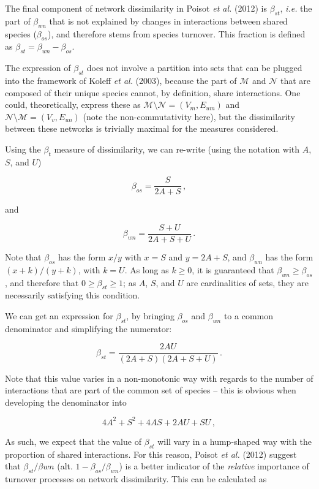 \documentclass[11pt]{article}
\begin{document}
The final component of network dissimilarity in Poisot \emph{et al.}
(2012) is \(\beta_{st}\), \emph{i.e.} the part of \(\beta_{wn}\) that is
not explained by changes in interactions between shared species
(\(\beta_{os}\)), and therefore stems from species turnover. This
fraction is defined as \(\beta_{st} = \beta_{wn}-\beta_{os}\).

The expression of \(\beta_{st}\) does not involve a partition into sets
that can be plugged into the framework of Koleff \emph{et al.} (2003),
because the part of \(\mathcal{M}\) and \(\mathcal{N}\) that are
composed of their unique species cannot, by definition, share
interactions. One could, theoretically, express these as
\(\mathcal{M} \setminus \mathcal{N} = (V_m, E_{um})\) and
\(\mathcal{N} \setminus \mathcal{M} = (V_v, E_{un})\) (note the
non-commutativity here), but the dissimilarity between these networks is
trivially maximal for the measures considered.

Using the \(\beta_t\) measure of dissimilarity, we can re-write (using
the notation with \(A\), \(S\), and \(U\))

\[\beta_{os} = \frac{S}{2A+S}\,,\]

and

\[\beta_{wn} = \frac{S+U}{2A+S+U}\,.\]

Note that \(\beta_{os}\) has the form \(x/y\) with \(x = S\) and
\(y = 2A+S\), and \(\beta_{wn}\) has the form \((x+k)/(y+k)\), with
\(k = U\). As long as \(k \ge 0\), it is guaranteed that
\(\beta_{wn} \ge \beta_{os}\), and therefore that
\(0 \ge \beta_{st} \ge 1\); as \(A\), \(S\), and \(U\) are cardinalities
of sets, they are necessarily satisfying this condition.

We can get an expression for \(\beta_{st}\), by bringing \(\beta_{os}\)
and \(\beta_{wn}\) to a common denominator and simplifying the
numerator:

\[\beta_{st} = \frac{2AU}{(2A+S)(2A+S+U)}\,.\]

Note that this value varies in a non-monotonic way with regards to the
number of interactions that are part of the common set of species --
this is obvious when developing the denominator into

\[4A^2 + S^2 + 4AS + 2AU + SU\,,\]

As such, we expect that the value of \(\beta_{st}\) will vary in a
hump-shaped way with the proportion of shared interactions. For this
reason, Poisot \emph{et al.} (2012) suggest that
\(\beta_{st}/\beta{wn}\) (alt. \(1-\beta_{os}/\beta_{wn}\)) is a better
indicator of the \emph{relative} importance of turnover processes on
network dissimilarity. This can be calculated as
\end{document}
